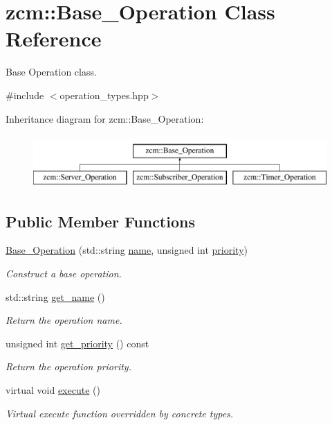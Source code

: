 \hypertarget{classzcm_1_1Base__Operation}{}\section{zcm\+:\+:Base\+\_\+\+Operation Class Reference}
\label{classzcm_1_1Base__Operation}


Base Operation class.  




{\ttfamily \#include $<$operation\+\_\+types.\+hpp$>$}

Inheritance diagram for zcm\+:\+:Base\+\_\+\+Operation\+:\begin{figure}[H]
\begin{center}
\leavevmode
\includegraphics[height=2.000000cm]{classzcm_1_1Base__Operation}
\end{center}
\end{figure}
\subsection*{Public Member Functions}
\begin{DoxyCompactItemize}
\item 
\hyperlink{classzcm_1_1Base__Operation_a87b61a8e801615935c649bae05b9c88e}{Base\+\_\+\+Operation} (std\+::string \hyperlink{classzcm_1_1Base__Operation_a2e2192550818d8f063fc7b2c76c5e21c}{name}, unsigned int \hyperlink{classzcm_1_1Base__Operation_a38af3bcc2578ef215772d595bf3fa358}{priority})
\begin{DoxyCompactList}\small\item\em Construct a base operation. \end{DoxyCompactList}\item 
std\+::string \hyperlink{classzcm_1_1Base__Operation_a46b6a3f23e18bc35425ec2dab80c849f}{get\+\_\+name} ()
\begin{DoxyCompactList}\small\item\em Return the operation name. \end{DoxyCompactList}\item 
unsigned int \hyperlink{classzcm_1_1Base__Operation_a3b15b35c31ed173d2abb193e9fba32ef}{get\+\_\+priority} () const 
\begin{DoxyCompactList}\small\item\em Return the operation priority. \end{DoxyCompactList}\item 
virtual void \hyperlink{classzcm_1_1Base__Operation_a58cb533edd6e6f220d2d1c260fbddca4}{execute} ()
\begin{DoxyCompactList}\small\item\em Virtual execute function overridden by concrete types. \end{DoxyCompactList}\end{DoxyCompactItemize}
